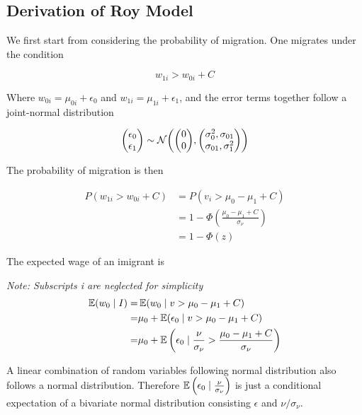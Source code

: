\subsection{Derivation of Roy Model}

We first start from considering the probability of migration. 
One migrates under the condition

\begin{equation}
    w_{1i} > w_{0i} + C
\end{equation}

Where $w_{0i} = \mu_{0i} + \epsilon_0$ and $w_{1i} = \mu_{1i} + \epsilon_1$, 
and the error terms together follow a joint-normal distribution

\begin{equation}
    \mqty(\epsilon_0 \\ \epsilon_1) 
    \sim
    \mathcal{N} \qty(
        \mqty(0 \\ 0),
        \mqty(\sigma_0^2, \sigma_{01} \\
              \sigma_{01}, \sigma_1^2)
    )
\end{equation}

The probability of migration is then 

\begin{align}
    P(w_{1i} > w_{0i} + C) &= P(v_i > \mu_0 - \mu_1 + C) \nonumber \\
    &=1 - \Phi(\frac{\mu_0 - \mu_1 + C}{\sigma_\nu}) \nonumber \\
    &=1 - \Phi(z)
\end{align}

The expected wage of an imigrant is

\newcommand{\given}{\mid}

\emph{Note: Subscripts i are neglected for simplicity}
\begin{align*}
    \E(w_{0} \given I) =& \E(w_{0} \given v > \mu_0 - \mu_1 + C)  \\
    =& \mu_0 + \E(\epsilon_0 \given  v > \mu_0 - \mu_1 + C )  \\
    =& \mu_0 + \E \left(
            \epsilon_0 \given \frac{\nu}{\sigma_\nu} > \frac{\mu_0 - \mu_1 + C}{\sigma_\nu}
            \right)
\end{align*}

A linear combination of random variables following normal distribution
also follows a normal distribution. Therefore $\E\left(\epsilon_0 \given \frac{\nu}{\sigma_\nu}\right)$
is just a conditional expectation of a bivariate normal distribution
consisting $\epsilon$ and $\nu/\sigma_\nu$.

